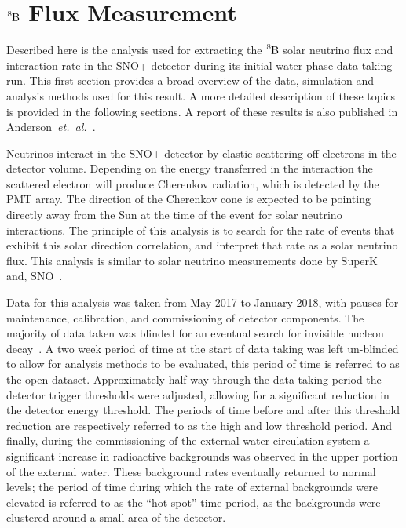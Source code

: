 \chapter{$\ce{^{8}B}$ Flux Measurement}
\label{sec:sigex}

\ifpdf
    \graphicspath{{sigex/figures/PNG/}{sigex/figures/PDF/}{sigex/figures/}}
\else
    \graphicspath{{sigex/figures/EPS/}{sigex/figures/}}
\fi


 Described here is the analysis used for extracting the $\ce{^{8}B}$ solar
 neutrino flux and interaction rate in the SNO+ detector during its initial
 water-phase data taking run.
This first section provides a broad overview of the data, simulation and analysis methods
used for this result.
A more detailed description of these topics is provided in the following sections.
A report of these results is also published in Anderson~\textit{et.\ al.}~\cite{snop_solar}.

Neutrinos interact in the SNO+ detector by elastic scattering off
electrons in the detector volume.
Depending on the energy transferred in the interaction
the scattered electron will produce Cherenkov radiation, which is detected by the PMT array.
The direction of the Cherenkov cone is expected to be pointing directly away
from the Sun at the time of the event for solar neutrino interactions.
The principle of this analysis is to search for the rate of events that exhibit
this solar direction correlation, and interpret that rate as a solar neutrino flux.
This analysis is similar to solar neutrino measurements done by SuperK~\cite{superk4} and, SNO~\cite{sno_combined}.

Data for this analysis was taken from May 2017 to January 2018, with pauses
for maintenance, calibration, and commissioning of detector components.
The majority of data taken was blinded for an eventual search for invisible
nucleon decay~\cite{snop_nd}.
A two week period of time at the start of data taking was left un-blinded to
allow for analysis methods to be evaluated, this period of time is referred
to as the open dataset.
Approximately half-way through the data taking period the detector trigger thresholds
were adjusted, allowing for a significant reduction in the detector energy
threshold.
The periods of time before and after this threshold reduction are respectively
referred to as the high and low threshold period.
And finally, during the commissioning of the external water circulation system
a significant increase in radioactive backgrounds was observed in the upper
portion of the external water.
These background rates eventually returned to normal levels; the period of time
during which the rate of external backgrounds were elevated is referred to
as the ``hot-spot'' time period, as the backgrounds were clustered around
a small area of the detector.

